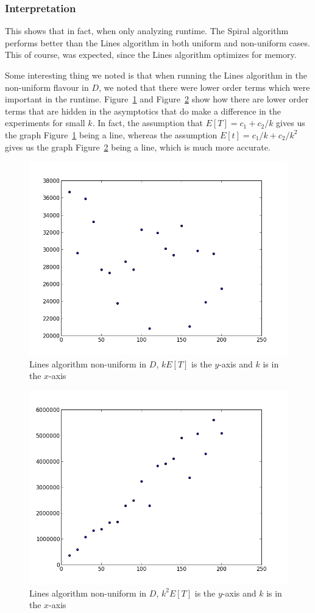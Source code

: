 \documentclass[runningheads,a4paper]{llncs}
\begin{document}
\subsubsection{Interpretation}
This shows that in fact, when only analyzing runtime. The Spiral algorithm performs better than the Lines algorithm in both uniform and non-uniform cases. This of course, was expected, since the Lines algorithm optimizes for memory. 

Some interesting thing we noted is that when running the Lines algorithm in the non-uniform flavour in $D$, we noted that there were lower order terms which were important in the runtime. Figure~\ref{nonuniforminD} and Figure~\ref{nonuniforminDtwo} show how there are lower order terms that are hidden in the asymptotics that do make a difference in the experiments for small $k$. In fact, the assumption that $E[T] = c_1 + c_2 / k$ gives us the graph Figure~\ref{nonuniforminD} being a line, whereas the assumption $E[t] = c_1/ k + c_2 / k^2$ gives us the graph Figure~\ref{nonuniforminDtwo} being a line, which is much more accurate.

\begin{figure}
\centering
\label{nonuniforminD}
\includegraphics[width=0.5\linewidth]{LinesNonUniformnT.png}
\caption{Lines algorithm non-uniform in $D$, $kE[T]$ is the $y$-axis and $k$ is in the $x$-axis}
\end{figure}

\begin{figure}
\centering
\label{nonuniforminDtwo}
\includegraphics[width=0.5\linewidth]{LinesNonUniformn2T.png}
\caption{Lines algorithm non-uniform in $D$, $k^2E[T]$ is the $y$-axis and $k$ is in the $x$-axis}
\end{figure}
\end{document}
